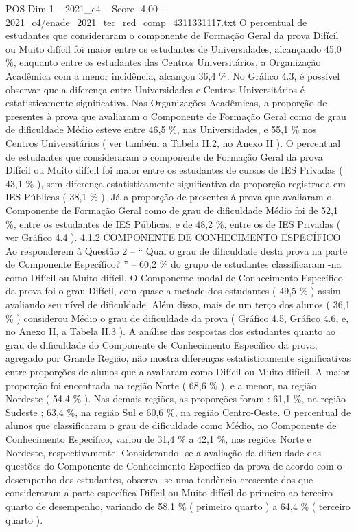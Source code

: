 \begin{textsample}{POS Dim 1 – 2021\_c4 – Score -4.00 – 2021\_c4/enade\_2021\_tec\_red\_comp\_4311331117.txt}
O percentual de estudantes que consideraram o componente de Formação Geral da prova Difícil ou Muito difícil foi maior entre os estudantes de Universidades, alcançando 45,0 \%, enquanto entre os estudantes das Centros Universitários, a Organização Acadêmica com a menor incidência, alcançou 36,4 \%.
No Gráfico 4.3, é possível observar que a diferença entre Universidades e Centros Universitários é estatisticamente significativa.
Nas Organizações Acadêmicas, a proporção de presentes à prova que avaliaram o Componente de Formação Geral como de grau de dificuldade Médio esteve entre 46,5 \%, nas Universidades, e 55,1 \% nos Centros Universitários ( ver também a Tabela II.2, no Anexo II ).
O percentual de estudantes que consideraram o componente de Formação Geral da prova Difícil ou Muito difícil foi maior entre os estudantes de cursos de IES Privadas ( 43,1 \% ), sem diferença estatisticamente significativa da proporção registrada em IES Públicas ( 38,1 \% ).
Já a proporção de presentes à prova que avaliaram o Componente de Formação Geral como de grau de dificuldade Médio foi de 52,1 \%, entre os estudantes de IES Públicas, e de 48,2 \%, entre os de IES Privadas ( ver Gráfico 4.4 ). 4.1.2 COMPONENTE DE CONHECIMENTO ESPECÍFICO Ao responderem à Questão 2 – “ Qual o grau de dificuldade desta prova na parte de Componente Específico? ” – 60,2 \% do grupo de estudantes classificaram -na como Difícil ou Muito difícil.
O Componente modal de Conhecimento Específico da prova foi o grau Difícil, com quase a metade dos estudantes ( 49,5 \% ) assim avaliando seu nível de dificuldade.
Além disso, mais de um terço dos alunos ( 36,1 \% ) considerou Médio o grau de dificuldade da prova ( Gráfico 4.5, Gráfico 4.6, e, no Anexo II, a Tabela II.3 ).
A análise das respostas dos estudantes quanto ao grau de dificuldade do Componente de Conhecimento Específico da prova, agregado por Grande Região, não mostra diferenças estatisticamente significativas entre proporções de alunos que a avaliaram como Difícil ou Muito difícil.
A maior proporção foi encontrada na região Norte ( 68,6 \% ), e a menor, na região Nordeste ( 54,4 \% ).
Nas demais regiões, as proporções foram : 61,1 \%, na região Sudeste ; 63,4 \%, na região Sul e 60,6 \%, na região Centro-Oeste.
O percentual de alunos que classificaram o grau de dificuldade como Médio, no Componente de Conhecimento Específico, variou de 31,4 \% a 42,1 \%, nas regiões Norte e Nordeste, respectivamente.
Considerando -se a avaliação da dificuldade das questões do Componente de Conhecimento Específico da prova de acordo com o desempenho dos estudantes, observa -se uma tendência crescente dos que consideraram a parte específica Difícil ou Muito difícil do primeiro ao terceiro quarto de desempenho, variando de 58,1 \% ( primeiro quarto ) a 64,4 \% ( terceiro quarto ).

\end{textsample}

